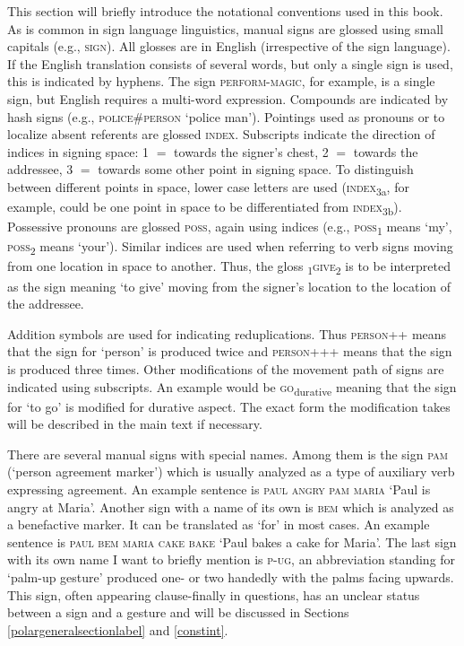 \label{notational} 
This section will briefly introduce the notational conventions used in this book. As is common in sign language linguistics, manual signs are glossed using small capitals (e.g., \textsc{sign}). All glosses are in English (irrespective of the sign language). If the English translation consists of several words, but only a single sign is used, this is indicated by hyphens. The sign \textsc{perform-magic}, for example, is a single sign, but English requires a multi-word expression. Compounds are indicated by hash signs (e.g., \textsc{police\#person} `police man'). Pointings used as pronouns or to localize absent referents are glossed \textsc{index}. Subscripts indicate the direction of indices in signing space: 1 $=$ towards the signer's chest, 2 $=$ towards the addressee, 3 $=$ towards some other point in signing space. To distinguish between different points in space, lower case letters are used (\textsc{index}\textsubscript{3a}, for example, could be one point in space to be differentiated from \textsc{index}\textsubscript{3b}). Possessive pronouns are glossed \textsc{poss}, again using indices (e.g., \textsc{poss}\textsubscript{1} means `my', \textsc{poss}\textsubscript{2} means `your'). Similar indices are used when referring to verb signs moving from one location in space to another. Thus, the gloss \textsubscript{1}\textsc{give}\textsubscript{2} is to be interpreted as the sign meaning `to give' moving from the signer’s location to the location of the addressee. 

Addition symbols are used for indicating reduplications. Thus \textsc{person}++ means that the sign for `person' is produced twice and \textsc{person}+++ means that the sign is produced three times. Other modifications of the movement path of signs are indicated using subscripts. An example would be \textsc{go}\textsubscript{durative} meaning that the sign for `to go' is modified for durative aspect. The exact form the modification takes will be described in the main text if necessary.

There are several manual signs with special names. Among them is the sign \textsc{pam} (`person agreement marker') which is usually analyzed as a type of auxiliary verb expressing agreement. An example sentence is \textsc{paul angry pam maria} `Paul is angry at Maria'. Another sign with a name of its own is \textsc{bem} which is analyzed as a benefactive marker. It can be translated as `for' in most cases. An example sentence is \textsc{paul bem maria cake bake} `Paul bakes a cake for Maria'. The last sign with its own name I want to briefly mention is \textsc{p-ug}, an abbreviation standing for `palm-up gesture' produced one- or two handedly with the palms facing upwards. This sign, often appearing clause-finally in questions, has an unclear status between a sign and a gesture and will be discussed in Sections \ref{polargeneralsectionlabel} and \ref{constint}. 

